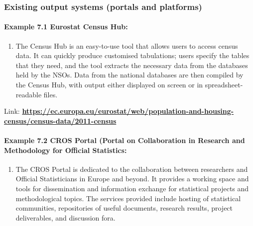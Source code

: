 \documentclass[
]{article}
\providecommand{\tightlist}{%
  \setlength{\itemsep}{0pt}\setlength{\parskip}{0pt}}
\begin{document}
\hypertarget{existing-output-systems-portals-and-platforms}{%
\subsubsection{Existing output systems (portals and platforms)}\label{existing-output-systems-portals-and-platforms}}

\hypertarget{example-7.1-eurostat-census-hub}{%
\paragraph{Example 7.1 Eurostat Census Hub:}\label{example-7.1-eurostat-census-hub}}

\begin{enumerate}
\def\labelenumi{\arabic{enumi}.}
\setcounter{enumi}{497}
\tightlist
\item
  The Census Hub is an easy-to-use tool that allows users to access
  census data. It can quickly produce customised tabulations; users
  specify the tables that they need, and the tool extracts the
  necessary data from the databases held by the NSOs. Data from the
  national databases are then compiled by the Census Hub, with output
  either displayed on screen or in spreadsheet-readable files.
\end{enumerate}

Link:
\href{https://ec.europa.eu/eurostat/web/population-and-housing-census/census-data/2011-census}{\textbf{https://ec.europa.eu/eurostat/web/population-and-housing-census/census-data/2011-census}}

\hypertarget{example-7.2-cros-portal-portal-on-collaboration-in-research-and-methodology-for-official-statistics}{%
\paragraph{\texorpdfstring{Example 7.2 \textbf{CROS Portal} (Portal on Collaboration in Research and Methodology for Official Statistics:}{Example 7.2 CROS Portal (Portal on Collaboration in Research and Methodology for Official Statistics:}}\label{example-7.2-cros-portal-portal-on-collaboration-in-research-and-methodology-for-official-statistics}}

\begin{enumerate}
\def\labelenumi{\arabic{enumi}.}
\setcounter{enumi}{498}
\tightlist
\item
  The CROS Portal is dedicated to the collaboration between
  researchers and Official Statisticians in Europe and beyond. It
  provides a working space and tools for dissemination and information
  exchange for statistical projects and methodological topics. The
  services provided include hosting of statistical communities,
  repositories of useful documents, research results, project
  deliverables, and discussion fora.
\end{enumerate}
\end{document}
